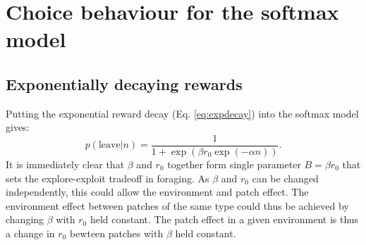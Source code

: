 \documentclass[11pt,a4paper]{article}
\begin{document}
\section{Choice behaviour for the softmax model}

\subsection{Exponentially decaying rewards}
Putting the exponential reward decay (Eq. \ref{eq:expdecay}) into the softmax model gives:
\begin{equation} \label{eq:softmax_p_leave}
p(\mathrm{leave}|n) = \frac{1}{1+\exp(\beta r_0\exp(-\alpha n))}.
\end{equation}
It is immediately clear that $\beta$ and $r_0$ together form single parameter $B = \beta r_0$ that sets the explore-exploit tradeoff in foraging. As $\beta$ and $r_0$ can be changed independently, this could allow the environment and patch effect. The environment effect between patches of the same type could thus be achieved by changing $\beta$ with $r_0$ held constant. The patch effect in a given environment is thus a change in $r_0$ bewteen patches with $\beta$ held constant. 


\end{document}
